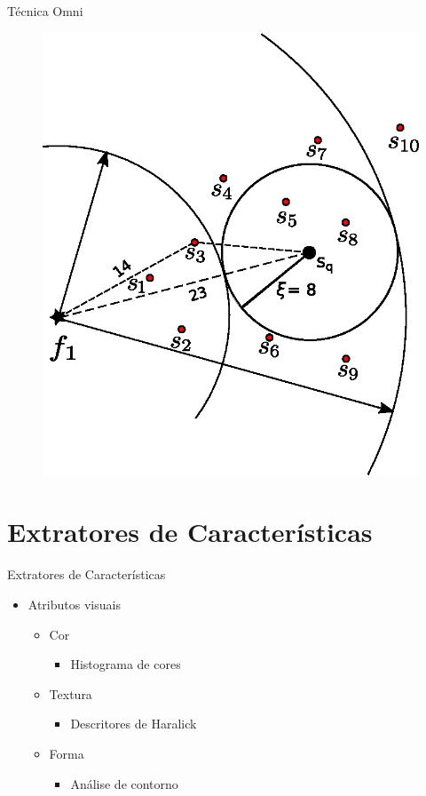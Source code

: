 \documentclass{beamer}
\begin{document}
\begin{frame}{Técnica Omni}
	\begin{figure}[H]
			\centering
			\includegraphics[width=.5\textwidth]{rg_ex2.eps}
	\end{figure}

\end{frame}

\section{Extratores de Características}

\begin{frame}{Extratores de Características}
  \begin{itemize}
   \item Atributos visuais\newline
   \begin{itemize}
      \item Cor
	  \begin{itemize}
	      \item Histograma de cores\newline
	  \end{itemize}
      \item Textura
	  \begin{itemize}
	      \item Descritores de Haralick\newline
	  \end{itemize}
      \item Forma
	  \begin{itemize}
	      \item Análise de contorno\newline
	  \end{itemize}
   \end{itemize}
   
  \end{itemize}

\end{frame}
\end{document}
